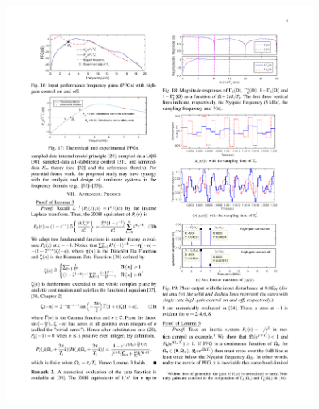 \documentclass [11pt, proquest] {uwthesis}[2020/02/24]
\begin{document}
\begin{figure}[!ht]
\begin{centering}
{\begin{centering}
\includegraphics[width=10cm]{Spectral-analysis/FIG19b.pdf}
\par\end{centering}
}
\par\end{centering}
\begin{centering}
\end{centering}
\end{figure}
\end{document}
